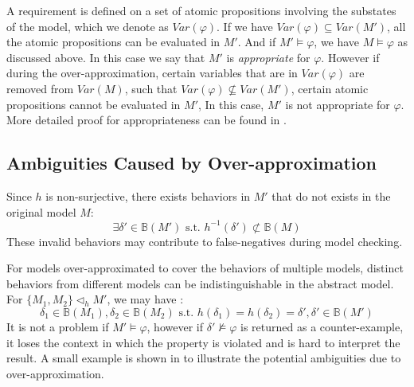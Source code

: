 A requirement is defined on a set of atomic propositions involving the substates of the model, which we denote as $Var(\varphi)$. If we have $Var(\varphi)\subseteq Var(M')$, all the atomic propositions can be evaluated in $M'$. And if $M'\models \varphi$, we have $M\models\varphi$ as discussed above. In this case we say that $M'$ is \emph{appropriate} for $\varphi$. However if during the over-approximation, certain variables that are in $Var(\varphi)$ are removed from $Var(M)$, such that $Var(\varphi)\not\subseteq Var(M')$, certain atomic propositions cannot be evaluated in $M'$, In this case, $M'$ is not appropriate for $\varphi$. More detailed proof for appropriateness can be found in \cite{regar_tech}.

\subsection{Ambiguities Caused by Over-approximation}
Since $h$ is non-surjective, there exists behaviors in $M'$ that do not exists in the original model $M$:
$$\exists\delta'\in\mathbb{B}(M')\text{ s.t. }h^{-1}(\delta')\not\subset\mathbb{B}(M)$$
These invalid behaviors may contribute to false-negatives during model checking.

For models over-approximated to cover the behaviors of multiple models, distinct behaviors from different models can be indistinguishable in the abstract model. For $\{M_1,M_2\}\triangleleft_h M'$, we may have :
$$ \delta_1\in\mathbb{B}(M_1),\delta_2\in \mathbb{B}(M_2)\text{ s.t. }h(\delta_1)=h(\delta_2)=\delta',\delta'\in \mathbb{B}(M')$$
It is not a problem if $M'\models\varphi$, however if $\delta'\not\models\varphi$ is returned as a counter-example, it loses the context in which the property is violated and is hard to interpret the result. A small example is shown in  to illustrate the potential ambiguities due to over-approximation. 


